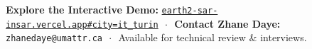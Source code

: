 \documentclass[10pt,letterpaper]{article}
\begin{document}
\vspace{-2pt}

\begin{tcolorbox}[colframe=threevblue,colback=threevblue,coltext=white,boxrule=0pt,top=4pt,bottom=4pt]
\centering\footnotesize
\textbf{Explore the Interactive Demo:} \href{https://earth2-sar-insar.vercel.app#city=it_turin&preset=extreme_weather&stage=v3}{\texttt{earth2-sar-insar.vercel.app\#city=it\_turin}} $\,\cdot\,$ 
\textbf{Contact Zhane Daye:} \texttt{zhanedaye@umattr.ca} $\,\cdot\,$ Available for technical review \& interviews.
\end{tcolorbox}
\end{document}
